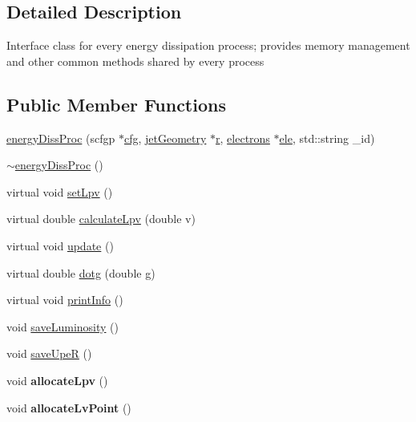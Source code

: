 \subsection{Detailed Description}
Interface class for every energy dissipation process; provides memory management and other common methods shared by every process \subsection*{Public Member Functions}
\begin{DoxyCompactItemize}
\item 
\hyperlink{classenergyDissProc_a0cf0b423089016fbe8a697378c519590}{energy\-Diss\-Proc} (scfgp $\ast$\hyperlink{classbaseClass_a744f87a6ebe63da08256c022d42a4ca7}{cfg}, \hyperlink{classjetGeometry}{jet\-Geometry} $\ast$\hyperlink{classbaseClass_a482bb9b1d94f3eb3f31026d14e9a2bb6}{r}, \hyperlink{classelectrons}{electrons} $\ast$\hyperlink{classenergyDissProc_a0dbf0777938131e938c1fdad5df38a7f}{ele}, std\-::string \-\_\-id)
\item 
\hyperlink{classenergyDissProc_a0bef95f227129b0a24295451ae9464fd}{$\sim$energy\-Diss\-Proc} ()
\item 
virtual void \hyperlink{classenergyDissProc_a93a39df53f30801f9f057cd55c05485d}{set\-Lpv} ()
\item 
virtual double \hyperlink{classenergyDissProc_aed17a9ce8a970cbd1e250c59947407ac}{calculate\-Lpv} (double v)
\item 
virtual void \hyperlink{classenergyDissProc_a6033524ea3d0fe38056bd74622f6c4ad}{update} ()
\item 
virtual double \hyperlink{classenergyDissProc_a8074e0db5d859a8815e7136c2fc41b46}{dotg} (double g)
\item 
virtual void \hyperlink{classenergyDissProc_ad1fbde0f7635a19a81412b9766916eb9}{print\-Info} ()
\item 
void \hyperlink{classenergyDissProc_ab1f8b1a54a2e0b8ad36459c79fa719a2}{save\-Luminosity} ()
\item 
void \hyperlink{classenergyDissProc_a309e85da2d5f945980f9e5eb7afc65c0}{save\-Upe\-R} ()
\item 
\hypertarget{classenergyDissProc_a97b76448b8d2f476fe4caf43efe39353}{void {\bfseries allocate\-Lpv} ()}\label{classenergyDissProc_a97b76448b8d2f476fe4caf43efe39353}

\item 
\hypertarget{classenergyDissProc_aae94d4b633da390c21b8fe7c4a5b8aa2}{void {\bfseries allocate\-Lv\-Point} ()}\label{classenergyDissProc_aae94d4b633da390c21b8fe7c4a5b8aa2}


\end{DoxyCompactItemize}
